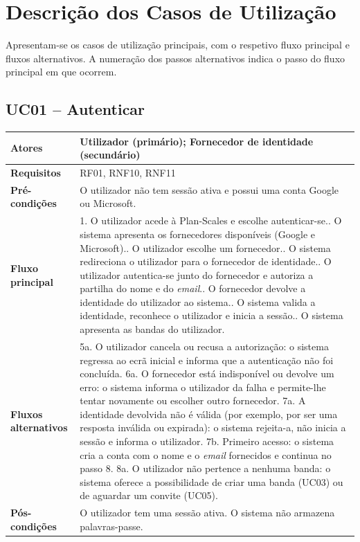 \section{Descrição dos Casos de Utilização}
\label{sec:descricao-casos-utilizacao}
Apresentam-se os casos de utilização principais, com o respetivo fluxo principal e fluxos alternativos. A numeração dos passos alternativos indica o passo do fluxo principal em que ocorrem.

\subsection{UC01 -- Autenticar}
\begin{tabular}{|p{3.2cm}|p{11cm}|}
\hline
\textbf{Atores} & Utilizador (primário); Fornecedor de identidade (secundário) \\ \hline
\textbf{Requisitos} & RF01, RNF10, RNF11 \\ \hline
\textbf{Pré-condições} & O utilizador não tem sessão ativa e possui uma conta Google ou Microsoft. \\ \hline
\textbf{Fluxo principal} &
1. O utilizador acede à Plan-Scales e escolhe autenticar-se.\newline
2. O sistema apresenta os fornecedores disponíveis (Google e Microsoft).\newline
3. O utilizador escolhe um fornecedor.\newline
4. O sistema redireciona o utilizador para o fornecedor de identidade.\newline
5. O utilizador autentica-se junto do fornecedor e autoriza a partilha do nome e do \textit{email}.\newline
6. O fornecedor devolve a identidade do utilizador ao sistema.\newline
7. O sistema valida a identidade, reconhece o utilizador e inicia a sessão.\newline
8. O sistema apresenta as bandas do utilizador. \\ \hline
\textbf{Fluxos alternativos} &
5a. O utilizador cancela ou recusa a autorização: o sistema regressa ao ecrã inicial e informa que a autenticação não foi concluída.\newline
6a. O fornecedor está indisponível ou devolve um erro: o sistema informa o utilizador da falha e permite-lhe tentar novamente ou escolher outro fornecedor.\newline
7a. A identidade devolvida não é válida (por exemplo, por ser uma resposta inválida ou expirada): o sistema rejeita-a, não inicia a sessão e informa o utilizador.\newline
7b. Primeiro acesso: o sistema cria a conta com o nome e o \textit{email} fornecidos e continua no passo 8.\newline
8a. O utilizador não pertence a nenhuma banda: o sistema oferece a possibilidade de criar uma banda (UC03) ou de aguardar um convite (UC05). \\ \hline
\textbf{Pós-condições} & O utilizador tem uma sessão ativa. O sistema não armazena palavras-passe. \\ \hline
\end{tabular}

